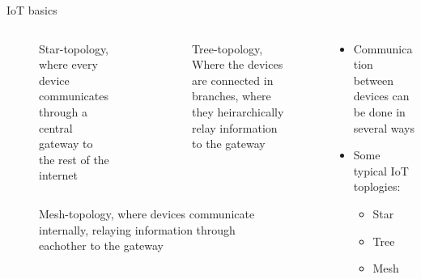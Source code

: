 \documentclass[aspectratio=169]{beamer}
\begin{document}
\begin{frame}{IoT basics}
\begin{columns}
	\begin{column}{0.5\textwidth}
		\centering
		\captionsetup{format=tcbcaptionsmall}
		\begin{columns}
			\begin{column}{0.5\textwidth}
				\begin{figure}[height=0.2\textheight]
  					
  					\caption{Star-topology, where every device communicates through a central gateway to the rest of the internet}
  					\label{fig:iot-star}
				\end{figure}
			\end{column}
			\begin{column}{0.5\textwidth}
				\begin{figure}[height=0.2\textheight]
  					
  					\caption{Tree-topology, Where the devices are connected in branches, where they heirarchically relay information to the gateway}
  					\label{fig:iot-tree}
				\end{figure}
			\end{column}
		\end{columns}
		\begin{columns}
			\begin{column}{0.5\textwidth}
				\begin{figure}[height=0.2\textheight]
  					
  					\caption{Mesh-topology, where devices communicate internally, relaying information through eachother to the gateway}
  					\label{fig:iot-mesh}
				\end{figure}
			\end{column}
		\end{columns}
	\end{column}
	\begin{column}{0.5\textwidth}
		\begin{textBox}
			\begin{itemize}
				\item Communication between devices can be done in several ways
				\item Some typical IoT toplogies:
				\begin{itemize}
					\item Star
					\item Tree
					\item Mesh
				\end{itemize}
			\end{itemize}
		\end{textBox}
	\end{column}
\end{columns}
\end{frame}
\end{document}

